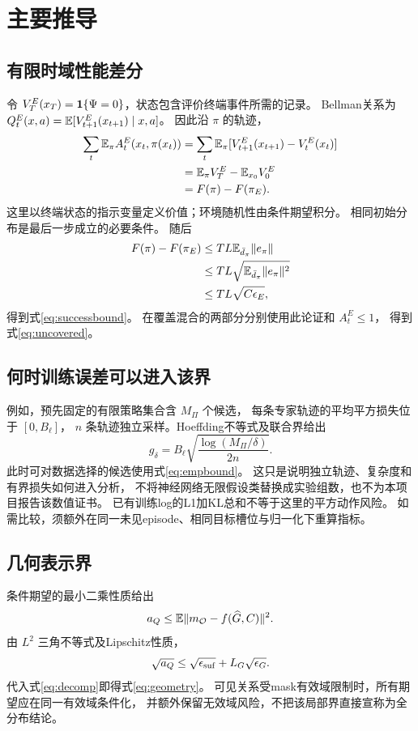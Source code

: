 \section{主要推导}
\subsection{有限时域性能差分}
令 $V_T^E(x_T)=\mathbf 1\{\Psi=0\}$，状态包含评价终端事件所需的记录。
Bellman关系为
$Q_t^E(x,a)=\mathbb E[V_{t+1}^E(x_{t+1})\mid x,a]$。
因此沿 $\pi$ 的轨迹，
\begin{align*}
 \sum_t\mathbb E_\pi A_t^E(x_t,\pi(x_t))
 &=\sum_t\mathbb E_\pi[V_{t+1}^E(x_{t+1})-V_t^E(x_t)]\\
 &=\mathbb E_\pi V_T^E-\mathbb E_{x_0}V_0^E\\
 &=F(\pi)-F(\pi_E).
\end{align*}
这里以终端状态的指示变量定义价值；环境随机性由条件期望积分。
相同初始分布是最后一步成立的必要条件。
随后
\begin{align*}
 F(\pi)-F(\pi_E)
 &\le TL\mathbb E_{\bar d_\pi}\lVert e_\pi\rVert\\
 &\le TL\sqrt{\mathbb E_{\bar d_\pi}\lVert e_\pi\rVert^2}\\
 &\le TL\sqrt{C\epsilon_E},
\end{align*}
得到式\eqref{eq:successbound}。
在覆盖混合的两部分分别使用此论证和 $A_t^E\le1$，
得到式\eqref{eq:uncovered}。

\subsection{何时训练误差可以进入该界}
例如，预先固定的有限策略集合含 $M_{\Pi}$ 个候选，
每条专家轨迹的平均平方损失位于 $[0,B_\ell]$，
$n$ 条轨迹独立采样。Hoeffding不等式及联合界给出
\begin{equation}
 g_\delta=B_\ell\sqrt{\frac{\log(M_{\Pi}/\delta)}{2n}}.
\end{equation}
此时可对数据选择的候选使用式\eqref{eq:empbound}。
这只是说明独立轨迹、复杂度和有界损失如何进入分析，
不将神经网络无限假设类替换成实验组数，也不为本项目报告该数值证书。
已有训练log的L1加KL总和不等于这里的平方动作风险。
如需比较，须额外在同一未见episode、相同目标槽位与归一化下重算指标。

\subsection{几何表示界}
条件期望的最小二乘性质给出
\[
 a_Q\le\mathbb E\lVert m_{\mathcal O}-f(\widehat G,C)\rVert^2.
\]
由 $L^2$ 三角不等式及Lipschitz性质，
\[
 \sqrt{a_Q}\le\sqrt{\epsilon_{\rm suf}}+L_G\sqrt{\epsilon_G}.
\]
代入式\eqref{eq:decomp}即得式\eqref{eq:geometry}。
可见关系受mask有效域限制时，所有期望应在同一有效域条件化，
并额外保留无效域风险，不把该局部界直接宣称为全分布结论。

